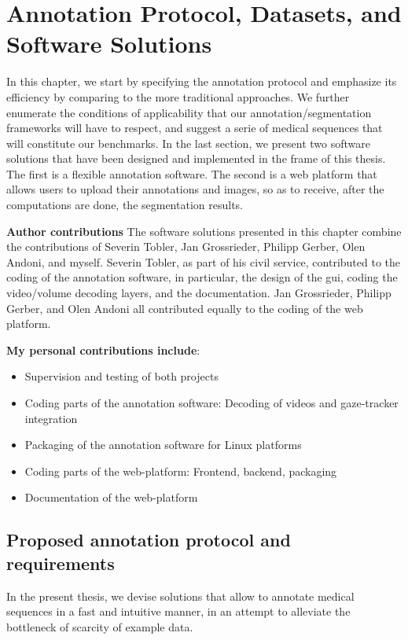 \chapter{Annotation Protocol, Datasets, and Software Solutions}
\label{datasets}


In this chapter, we start by specifying the annotation protocol and emphasize its efficiency by comparing to the more traditional approaches.
We further enumerate the conditions of applicability that our annotation/segmentation frameworks will have to respect, and suggest a serie of medical sequences that will constitute our benchmarks.
In the last section, we present two software solutions that have been designed and implemented in the frame of this thesis.
The first is a flexible annotation software.
The second is a web platform that allows users to upload their annotations and images, so as to receive, after the computations are done, the segmentation results.

\textbf{Author contributions} The software solutions presented in this chapter combine the contributions of Severin Tobler, Jan Grossrieder, Philipp Gerber, Olen Andoni, and myself.
Severin Tobler, as part of his civil service, contributed to the coding of the annotation software, in particular, the design of the \gls{gui}, coding the video/volume decoding layers, and the documentation.
Jan Grossrieder, Philipp Gerber, and Olen Andoni all contributed equally to the coding of the web platform.

\textbf{My personal contributions include}:
\begin{itemize}
    \item Supervision and testing of both projects
    \item Coding parts of the annotation software: Decoding of videos and gaze-tracker integration
    \item Packaging of the annotation software for Linux platforms
    \item Coding parts of the web-platform: Frontend, backend, packaging
    \item Documentation of the web-platform
\end{itemize}

\section{Proposed annotation protocol and requirements}

In the present thesis, we devise solutions that allow to annotate medical sequences in a fast and intuitive manner, in an attempt to alleviate the bottleneck of scarcity of example data.

